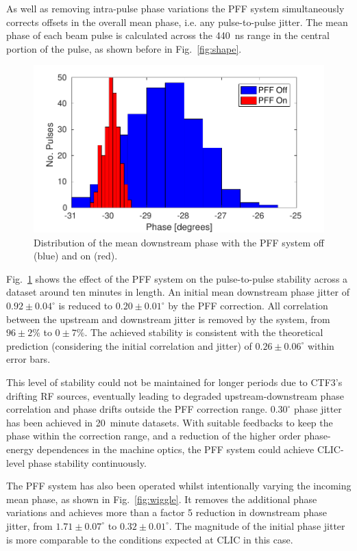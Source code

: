 \documentclass[%
 reprint,
superscriptaddress,
 amsmath,amssymb,
 prl,
]{revtex4-1}
\begin{document}
As well as removing intra-pulse phase variations the PFF system simultaneously 
corrects offsets in the overall mean phase, i.e. any pulse-to-pulse jitter. The 
mean phase of each beam pulse is calculated across the 440~ns range in the 
central portion of the pulse, as shown before in Fig.~\ref{fig:shape}.

\begin{figure}
	\includegraphics[width=\columnwidth]{figs/meanJit}%
	\caption{\label{fig:meanJit}Distribution of the mean downstream phase with 
		the 
		PFF system off (blue) and on (red).}
\end{figure}

Fig.~\ref{fig:meanJit} shows the effect of the PFF system on the pulse-to-pulse 
stability across a dataset around ten minutes in length. An 
initial mean downstream phase jitter of \(0.92\pm0.04^\circ\) is reduced to \(0.20\pm0.01^\circ\) by the PFF 
correction. All correlation between the upstream and downstream jitter is 
removed by the system, from 
\(96\pm2\%\) to \(0\pm7\%\). The achieved stability is consistent with the 
theoretical prediction (considering the initial correlation and jitter) of 
\(0.26\pm0.06^\circ\) within error bars.

This level of stability could not be maintained for longer periods due to 
CTF3's drifting RF sources, eventually leading to degraded 
upstream-downstream phase correlation and phase drifts outside the PFF 
correction range. \(0.30^\circ\) phase jitter has been 
achieved in 20~minute datasets. With suitable feedbacks to keep the phase 
within the correction range, and a reduction of the higher order phase-energy 
dependences in the machine optics, the PFF system could achieve CLIC-level 
phase stability continuously.

The PFF system has also been operated 
whilst intentionally varying the incoming mean phase, as shown in 
Fig.~\ref{fig:wiggle}. It removes the additional phase variations 
and achieves more than a factor 5 reduction in downstream phase jitter, from 
\(1.71\pm0.07^\circ\) to \(0.32\pm0.01^\circ\). The magnitude of 
the initial phase jitter is more comparable to the conditions expected at CLIC 
in this case.
\end{document}
